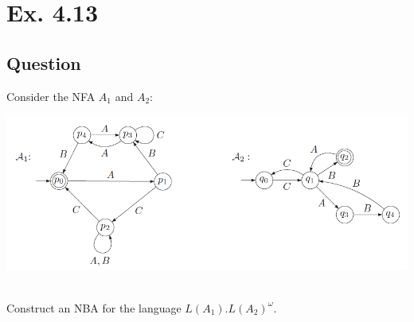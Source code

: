 \documentclass[12pt]{article}
\begin{document}
\newpage
\section*{Ex. 4.13}
\subsection*{Question}
Consider the NFA $A_1$ and $A_2$:\\
\begin{centering}
	\includegraphics*[scale=0.7]{ex413q.png}
\end{centering}\\
Construct an NBA for the language $L(A_1).L(A_2)^\omega$.
\end{document}
